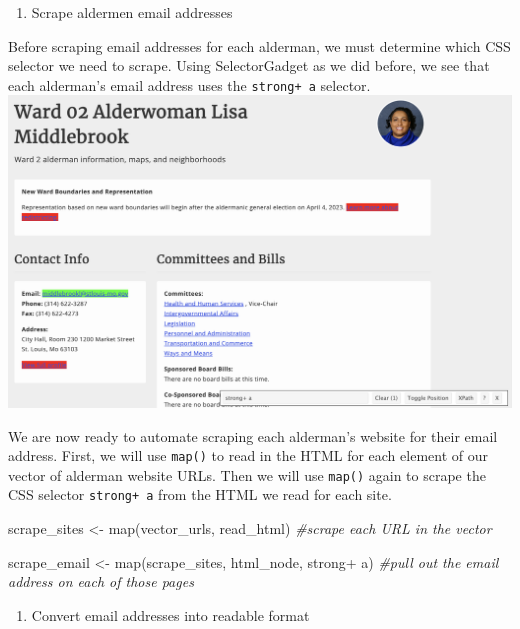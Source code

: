 \documentclass[
  krantz2]{krantz}
\makeatletter
\newenvironment{Shaded}{\begin{snugshade}}{\end{snugshade}}
\newcommand{\CommentTok}[1]{\textcolor[rgb]{0.37,0.37,0.37}{\textit{#1}}}
\newcommand{\FunctionTok}[1]{\textcolor[rgb]{0,0,0}{#1}}
\newcommand{\NormalTok}[1]{#1}
\newcommand{\OtherTok}[1]{\textcolor[rgb]{0.37,0.37,0.37}{#1}}
\newcommand{\StringTok}[1]{\textcolor[rgb]{0.5,0.5,0.5}{#1}}
\providecommand{\tightlist}{%
  \setlength{\itemsep}{0pt}\setlength{\parskip}{0pt}}
\newenvironment{kframe}{%
\medskip{}
\setlength{\fboxsep}{.8em}
 \def\at@end@of@kframe{}%
 \ifinner\ifhmode%
  \def\at@end@of@kframe{\end{minipage}}%
  \begin{minipage}{\columnwidth}%
 \fi\fi%
 \def\FrameCommand##1{\hskip\@totalleftmargin \hskip-\fboxsep
 \colorbox{shadecolor}{##1}\hskip-\fboxsep
     \hskip-\linewidth \hskip-\@totalleftmargin \hskip\columnwidth}%
 \MakeFramed {\advance\hsize-\width
   \@totalleftmargin\z@ \linewidth\hsize
   \@setminipage}}%
 {\par\unskip\endMakeFramed%
 \at@end@of@kframe}
\renewenvironment{Shaded}{\begin{kframe}}{\end{kframe}}
\makeatother
\begin{document}
\begin{enumerate}
\def\labelenumi{\arabic{enumi}.}
\tightlist
\item
  Scrape aldermen email addresses
\end{enumerate}

Before scraping email addresses for each alderman, we must determine which CSS selector we need to scrape. Using SelectorGadget as we did before, we see that each alderman's email address uses the \texttt{strong+\ a} selector.
\includegraphics{images/middlebrook-email.png}

We are now ready to automate scraping each alderman's website for their email address. First, we will use \texttt{map()} to read in the HTML for each element of our vector of alderman website URLs. Then we will use \texttt{map()} again to scrape the CSS selector \texttt{strong+\ a} from the HTML we read for each site.

\begin{Shaded}
\begin{Highlighting}[]
\NormalTok{scrape\_sites }\OtherTok{\textless{}{-}} \FunctionTok{map}\NormalTok{(vector\_urls, read\_html) }
\CommentTok{\#scrape each URL in the vector}

\NormalTok{scrape\_email }\OtherTok{\textless{}{-}} \FunctionTok{map}\NormalTok{(scrape\_sites, html\_node, }\StringTok{\textquotesingle{}strong+ a\textquotesingle{}}\NormalTok{) }
\CommentTok{\#pull out the email address on each of those pages}
\end{Highlighting}
\end{Shaded}

\begin{enumerate}
\def\labelenumi{\arabic{enumi}.}
\setcounter{enumi}{1}
\tightlist
\item
  Convert email addresses into readable format
\end{enumerate}
\end{document}
